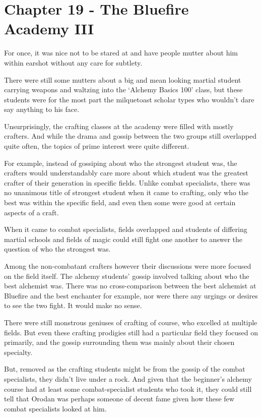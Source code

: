 \documentclass[a4paper,10pt]{book}
\begin{document}
\section*{Chapter 19 - The Bluefire Academy III}
%
\par
For once, it was nice not to be stared at and have people mutter about him within earshot without any care for subtlety.\par
There were still some mutters about a big and mean looking martial student carrying weapons and waltzing into the ‘Alchemy Basics 100’ class, but these students were for the most part the milquetoast scholar types who wouldn’t dare say anything to his face.\par
Unsurprisingly, the crafting classes at the academy were filled with mostly crafters. And while the drama and gossip between the two groups still overlapped quite often, the topics of prime interest were quite different.\par
For example, instead of gossiping about who the strongest student was, the crafters would understandably care more about which student was the greatest crafter of their generation in specific fields. Unlike combat specialists, there was no unanimous title of strongest student when it came to crafting, only who the best was within the specific field, and even then some were good at certain aspects of a craft.\par
When it came to combat specialists, fields overlapped and students of differing martial schools and fields of magic could still fight one another to answer the question of who the strongest was.\par
Among the non-combatant crafters however their discussions were more focused on the field itself. The alchemy students’ gossip involved talking about who the best alchemist was. There was no cross-comparison between the best alchemist at Bluefire and the best enchanter for example, nor were there any urgings or desires to see the two fight. It would make no sense.\par
There were still monstrous geniuses of crafting of course, who excelled at multiple fields. But even these crafting prodigies still had a particular field they focused on primarily, and the gossip surrounding them was mainly about their chosen specialty.\par
But, removed as the crafting students might be from the gossip of the combat specialists, they didn’t live under a rock. And given that the beginner’s alchemy course had at least some combat-specialist students who took it, they could still tell that Orodan was perhaps someone of decent fame given how these few combat specialists looked at him.\par
\end{document}
